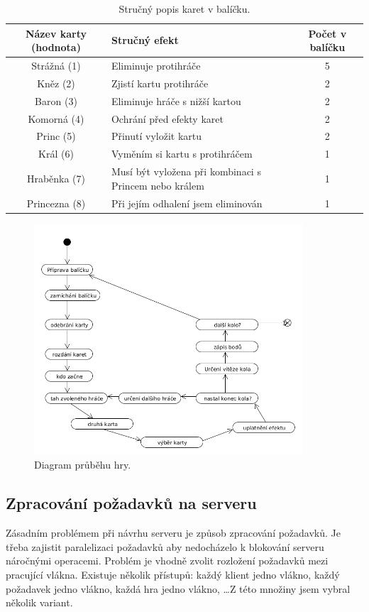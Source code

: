 \documentclass[12pt, a4paper]{article}
\begin{document}
\begin{table}[ht]
\centering
\begin{tabular}{|c | p{7cm} | c|}
\hline
Název karty (hodnota) &  Stručný efekt & Počet v balíčku\\
\hline
Strážná (1) & Eliminuje protihráče & 5\\
\hline
Kněz (2) & Zjistí kartu protihráče & 2\\
\hline
Baron (3) & Eliminuje hráče s nižší kartou & 2 \\
\hline
Komorná (4) & Ochrání před efekty karet & 2 \\
\hline
Princ (5) & Přinutí vyložit kartu & 2\\
\hline
Král (6) & Vyměním si kartu s protihráčem & 1\\
\hline
Hraběnka (7)& Musí být vyložena při kombinaci s Princem nebo králem & 1\\
\hline
Princezna (8)& Při jejím odhalení jsem eliminován & 1\\
\hline
\end{tabular}
\label{tab:karty}
\caption{Stručný popis karet v balíčku.}
\end{table}

\begin{figure}[ht]
\centering
\includegraphics[bb= 0 0 730 630 , width=10cm]{gameDiag.png}
\caption{Diagram průběhu hry.}
\label{fig:game}
\end{figure}

\subsection{Zpracování požadavků na serveru}

Zásadním problémem při návrhu serveru je způsob zpracování požadavků. Je třeba zajistit paralelizaci požadavků aby nedocházelo k blokování serveru náročnými operacemi. Problém je vhodně zvolit rozložení požadavků mezi pracující vlákna. Existuje několik přístupů: každý klient jedno vlákno, každý požadavek jedno vlákno, každá hra jedno vlákno, \ldots Z této množiny jsem vybral několik variant.
\end{document}
